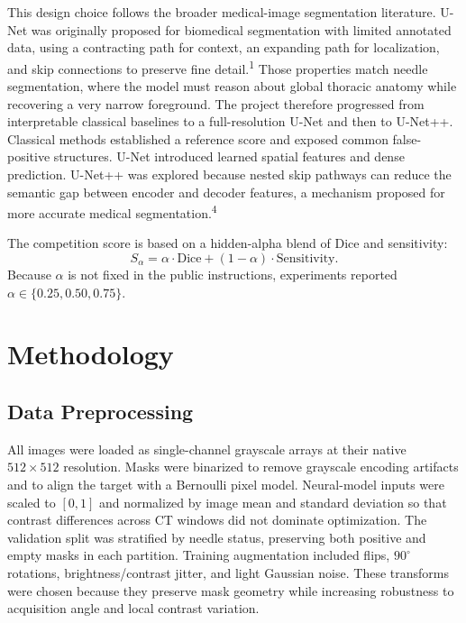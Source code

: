 \documentclass[10pt]{article}
\begin{document}
This design choice follows the broader medical-image segmentation literature. U-Net was originally proposed for biomedical segmentation with limited annotated data, using a contracting path for context, an expanding path for localization, and skip connections to preserve fine detail.\textsuperscript{1} Those properties match needle segmentation, where the model must reason about global thoracic anatomy while recovering a very narrow foreground. The project therefore progressed from interpretable classical baselines to a full-resolution U-Net and then to U-Net++. Classical methods established a reference score and exposed common false-positive structures. U-Net introduced learned spatial features and dense prediction. U-Net++ was explored because nested skip pathways can reduce the semantic gap between encoder and decoder features, a mechanism proposed for more accurate medical segmentation.\textsuperscript{4}

The competition score is based on a hidden-alpha blend of Dice and sensitivity:
\begin{equation}
S_{\alpha} = \alpha \cdot \mathrm{Dice} + (1-\alpha)\cdot \mathrm{Sensitivity}.
\end{equation}
Because $\alpha$ is not fixed in the public instructions, experiments reported $\alpha \in \{0.25,0.50,0.75\}$.

\section{Methodology}
\subsection{Data Preprocessing}
All images were loaded as single-channel grayscale arrays at their native $512 \times 512$ resolution. Masks were binarized to remove grayscale encoding artifacts and to align the target with a Bernoulli pixel model. Neural-model inputs were scaled to $[0,1]$ and normalized by image mean and standard deviation so that contrast differences across CT windows did not dominate optimization. The validation split was stratified by needle status, preserving both positive and empty masks in each partition. Training augmentation included flips, $90^\circ$ rotations, brightness/contrast jitter, and light Gaussian noise. These transforms were chosen because they preserve mask geometry while increasing robustness to acquisition angle and local contrast variation.
\end{document}
